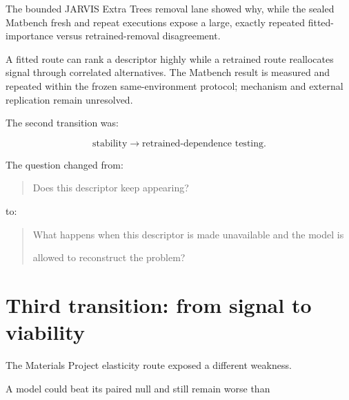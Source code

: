 \documentclass[11pt,a4paper,oneside]{report}
\begin{document}
The bounded JARVIS Extra Trees removal lane showed why, while the sealed Matbench fresh and repeat executions expose a large, exactly repeated fitted-importance versus retrained-removal disagreement.



A fitted route can rank a descriptor highly while a retrained route reallocates signal through correlated alternatives. The Matbench result is measured and repeated within the frozen same-environment protocol; mechanism and external replication remain unresolved.



The second transition was:



\begin{equation}
\text{stability}
\rightarrow
\text{retrained-dependence testing}.
\end{equation}



The question changed from:



\begin{quote}



Does this descriptor keep appearing?



\end{quote}



to:



\begin{quote}



What happens when this descriptor is made unavailable and the model is

allowed to reconstruct the problem?



\end{quote}





\section{Third transition: from signal to viability}



The Materials Project elasticity route exposed a different weakness.



A model could beat its paired null and still remain worse than
\end{document}
